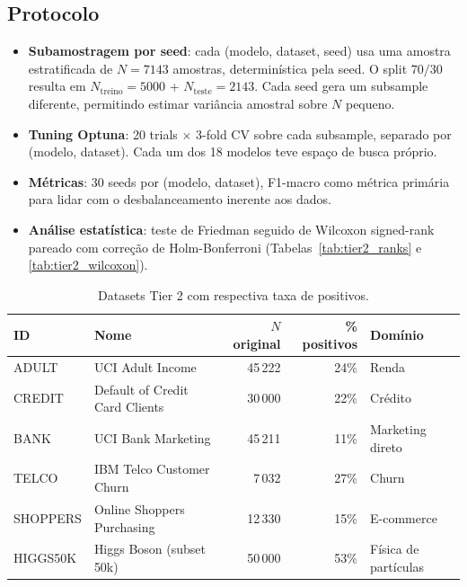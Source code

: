 \documentclass[12pt,a4paper]{article}
\begin{document}
\subsection{Protocolo}

\begin{itemize}
  \item \textbf{Subamostragem por seed}: cada (modelo, dataset, seed) usa
        uma amostra estratificada de $N{=}7143$ amostras, determinística pela
        seed. O split $70/30$ resulta em $N_{\text{treino}}{=}5000$ +
        $N_{\text{teste}}{=}2143$. Cada seed gera um subsample diferente,
        permitindo estimar variância amostral sobre $N$ pequeno.
  \item \textbf{Tuning Optuna}: 20 trials $\times$ 3-fold CV sobre cada
        subsample, separado por (modelo, dataset). Cada um dos 18 modelos teve
        espaço de busca próprio.
  \item \textbf{Métricas}: 30 seeds por (modelo, dataset), F1-macro como
        métrica primária para lidar com o desbalanceamento inerente aos dados.
  \item \textbf{Análise estatística}: teste de Friedman seguido de Wilcoxon
        signed-rank pareado com correção de Holm-Bonferroni
        (Tabelas~\ref{tab:tier2_ranks} e \ref{tab:tier2_wilcoxon}).
\end{itemize}

\begin{table}[H]
\centering
\caption{Datasets Tier 2 com respectiva taxa de positivos.}
\label{tab:datasets_tier2}
\begin{tabular}{llrrl}
\toprule
\textbf{ID} & \textbf{Nome} & \textbf{$N$ original} & \textbf{\% positivos} & \textbf{Domínio} \\
\midrule
ADULT     & UCI Adult Income               & 45\,222 & 24\% & Renda \\
CREDIT    & Default of Credit Card Clients & 30\,000 & 22\% & Crédito \\
BANK      & UCI Bank Marketing             & 45\,211 & 11\% & Marketing direto \\
TELCO     & IBM Telco Customer Churn       &  7\,032 & 27\% & Churn \\
SHOPPERS  & Online Shoppers Purchasing     & 12\,330 & 15\% & E-commerce \\
HIGGS50K  & Higgs Boson (subset 50k)       & 50\,000 & 53\% & Física de partículas \\
\bottomrule
\end{tabular}
\end{table}
\end{document}
